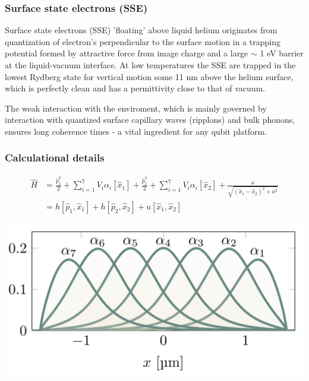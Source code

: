 \documentclass{beamer}
\begin{document}
\begin{frame}
\frametitle{Surface state electrons (SSE)}

\begin{block}{}
Surface state electrons (SSE) 'floating' above liquid helium
originates from quantization of electron's perpendicular to the
surface motion in a trapping potential formed by attractive force from
image charge and a large $\sim$ 1 eV barrier at the liquid-vacuum
interface. At low temperatures the SSE are trapped in the lowest
Rydberg state for vertical motion some 11 nm above the helium surface,
which is perfectly clean and has a permittivity close to that of
vacuum.
\end{block}

\begin{block}{}
The weak interaction with the enviroment, which is mainly governed
by interaction with quantized surface capillary waves (ripplons) and
bulk phonons, ensures long coherence times - a vital ingredient for
any qubit platform. 
\end{block}
\end{frame}

\begin{frame}
\frametitle{Calculational details}

\begin{align}
\hat{H} &=\frac{\hat{p}_1^2}{2} + \sum_{i = 1}^7 V_i\alpha_i[\hat{x}_1] + \frac{\hat{p}_2^2}{2} + \sum_{i = 1}^7 V_i\alpha_i[\hat{x}_2] + \frac{\kappa}{\sqrt{(\hat{x}_1-\hat{x}_2)^2 + a^2}}\\
&= h[\hat{p}_1,\hat{x}_1] + h[\hat{p}_2,\hat{x}_2] + u[\hat{x}_1,\hat{x}_2]
\end{align}

\vspace{6mm}

\centerline{\includegraphics[width=0.8\linewidth]{qcfigures/well_basis.png}}

\vspace{6mm}
\end{frame}
\end{document}
